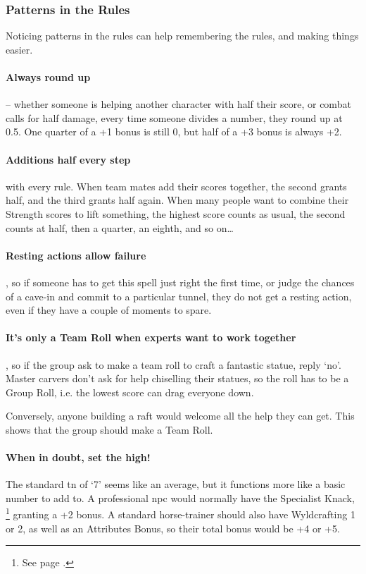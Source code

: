 \begin{multicols}{2}
\subsubsection{Patterns in the Rules}

Noticing patterns in the rules can help remembering the rules, and making things easier.

\paragraph{Always round up} -- whether someone is helping another character with half their score, or combat calls for half damage, every time someone divides a number, they round up at 0.5.
One quarter of a +1 bonus is still 0, but half of a +3 bonus is always +2.

\paragraph{Additions half every step} with every rule.
When team mates add their scores together, the second grants half, and the third grants half again.
When many people want to combine their Strength scores to lift something, the highest score counts as usual, the second counts at half, then a quarter, an eighth, and so on\ldots

\paragraph{Resting actions allow failure},
so if someone has to get this spell just right the first time, or judge the chances of a cave-in and commit to a particular tunnel, they do not get a resting action, even if they have a couple of moments to spare.

\paragraph{It's only a Team Roll when experts want to work together}, so if the group ask to make a team roll to craft a fantastic statue, reply `no'.
Master carvers don't ask for help chiselling their statues, so the roll has to be a Group Roll, i.e. the lowest score can drag everyone down.

Conversely, anyone building a raft would welcome all the help they can get.
This shows that the group should make a Team Roll.

\paragraph{When in doubt, set the  high!}
The standard \gls{tn} of `7' seems like an average, but it functions more like a basic number to add to.
A professional \gls{npc} would normally have the Specialist Knack,%
\footnote{See page \pageref{specialist}.}
granting a +2 bonus.
A standard horse-trainer should also have Wyldcrafting 1 or 2, as well as an Attributes Bonus, so their total bonus would be +4 or +5.


\end{multicols}
